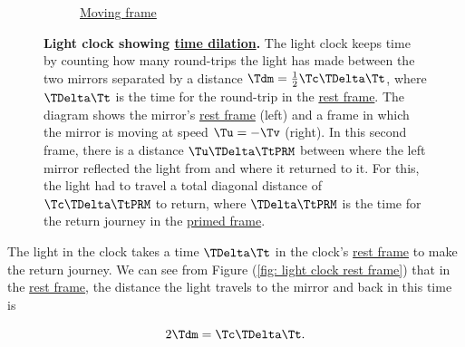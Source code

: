 \begin{figure}[H]
\begin{subfigure}{.49\textwidth}
		\caption{\protect\hyperlink{def-Moving-Frame}{Moving frame}}
	\end{subfigure}
	\caption{\textbf{Light clock showing \protect\hyperlink{def-time-dilation}{time dilation}.} The light clock keeps time by counting how many round-trips the light has made between the two mirrors separated by a distance ${\Tdm }=\frac{1}{2}{\Tc }{\TDelta  \Tt }$, where ${\TDelta \Tt }$ is the time for the round-trip in the \protect\hyperlink{def-proper-frame}{rest frame}. The diagram shows the mirror's \protect\hyperlink{def-proper-frame}{rest frame} (left) and a frame in which the mirror is moving at speed ${\Tu }=-{\Tv }$ (right). In this second frame, there is a distance ${\Tu }{\TDelta  \TtPRM  }$ between where the left mirror reflected the light from and where it returned to it. For this, the light had to travel a total diagonal distance of ${\Tc }{\TDelta  \TtPRM  }$ to return, where ${\TDelta \TtPRM }$ is the time for the return journey in the \protect\hyperlink{def-Primed-Frame}{primed frame}.}
	\label{fig: light clock}
\end{figure}

The light in the clock takes a time ${\TDelta \Tt }$ in the clock's \hyperlink{def-proper-frame}{rest frame} to make the return journey.
We can see from Figure (\ref{fig: light clock rest frame}) that in the \hyperlink{def-proper-frame}{rest frame}, the distance the light travels to the mirror and back in this time is

\begin{equation}
	2{\Tdm } = {\Tc }{\TDelta \Tt }.
\end{equation}

